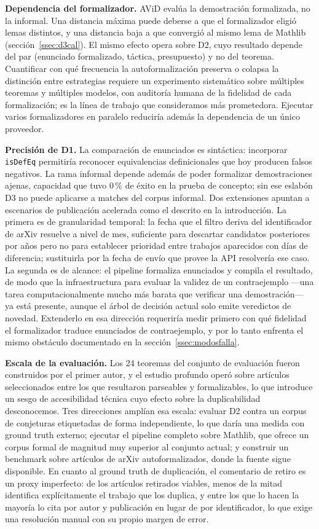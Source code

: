 \documentclass[12pt,a4paper]{article}
\theoremstyle{remark}
\begin{document}
\textbf{Dependencia del formalizador.} AViD evalúa la demostración formalizada, no la informal. Una distancia máxima puede deberse a que el formalizador eligió lemas distintos, y una distancia baja a que convergió al mismo lema de Mathlib (sección~\ref{ssec:d3cal}). El mismo efecto opera sobre D2, cuyo resultado depende del par (enunciado formalizado, táctica, presupuesto) y no del teorema. Cuantificar con qué frecuencia la autoformalización preserva o colapsa la distinción entre estrategias requiere un experimento sistemático sobre múltiples teoremas y múltiples modelos, con auditoría humana de la fidelidad de cada formalización; es la línea de trabajo que consideramos más prometedora. Ejecutar varios formalizadores en paralelo reduciría además la dependencia de un único proveedor.

\textbf{Precisión de D1.} La comparación de enunciados es sintáctica: incorporar \texttt{isDefEq} permitiría reconocer equivalencias definicionales que hoy producen falsos negativos. La rama informal depende además de poder formalizar demostraciones ajenas, capacidad que tuvo 0\,\% de éxito en la prueba de concepto; sin ese eslabón D3 no puede aplicarse a matches del corpus informal.
Dos extensiones apuntan a escenarios de publicación acelerada como el descrito
en la introducción. La primera es de granularidad temporal: la fecha que el
filtro deriva del identificador de arXiv resuelve a nivel de mes, suficiente
para descartar candidatos posteriores por años pero no para establecer
prioridad entre trabajos aparecidos con días de diferencia; sustituirla por la
fecha de envío que provee la API resolvería ese caso. La segunda es de alcance:
el pipeline formaliza enunciados y compila el resultado, de modo que la
infraestructura para evaluar la validez de un contraejemplo ---una tarea
computacionalmente mucho más barata que verificar una demostración--- ya está
presente, aunque el árbol de decisión actual solo emite veredictos de novedad.
Extenderlo en esa dirección requeriría medir primero con qué fidelidad el
formalizador traduce enunciados de contraejemplo, y por lo tanto enfrenta el
mismo obstáculo documentado en la sección~\ref{ssec:modosfalla}.

\textbf{Escala de la evaluación.} Los 24 teoremas del conjunto de evaluación fueron construidos por el primer autor, y el estudio profundo operó sobre artículos seleccionados entre los que resultaron parseables y formalizables, lo que introduce un sesgo de accesibilidad técnica cuyo efecto sobre la duplicabilidad desconocemos. Tres direcciones amplían esa escala: evaluar D2 contra un corpus de conjeturas etiquetadas de forma independiente, lo que daría una medida con ground truth externo; ejecutar el pipeline completo sobre Mathlib, que ofrece un corpus formal de magnitud muy superior al conjunto actual; y construir un benchmark sobre artículos de arXiv autoformalizados, donde la fuente sigue disponible. En cuanto al ground truth de duplicación, el comentario de retiro es un proxy imperfecto: de los artículos retirados viables, menos de la mitad identifica explícitamente el trabajo que los duplica, y entre los que lo hacen la mayoría lo cita por autor y publicación en lugar de por identificador, lo que exige una resolución manual con su propio margen de error.
\end{document}
